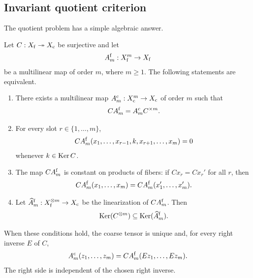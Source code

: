 \subsection{Invariant quotient criterion}
The quotient problem has a simple algebraic answer.

\begin{PRIQtheorem}\label{PRIQ:thm:universal-quotient}
Let $C:X_{\mathrm f}\twoheadrightarrow X_{\mathrm c}$ be surjective and let
\[
  A_m^{\mathrm f}:X_{\mathrm f}^m\to X_{\mathrm f}
\]
be a multilinear map of order $m$, where $m\geq1$.  The following statements are equivalent.

\begin{enumerate}[label=(\roman*),leftmargin=2.8em]
\item There exists a multilinear map $A_m^{\mathrm c}:X_{\mathrm c}^m\to X_{\mathrm c}$ of order $m$ such that
\[
  CA_m^{\mathrm f}=A_m^{\mathrm c}C^{\times m}.
\]

\item For every slot $r\in\{1,\ldots,m\}$,
\begin{equation}\label{PRIQ:eq:slot-kernel-condition}
  CA_m^{\mathrm f}(x_1,\ldots,x_{r-1},k,x_{r+1},\ldots,x_m)=0
\end{equation}
whenever $k\in\operatorname{Ker} C$.

\item The map $CA_m^{\mathrm f}$ is constant on products of fibers: if $Cx_r=Cx_r'$ for all $r$, then
\begin{equation}\label{PRIQ:eq:fiber-constancy-abstract}
  CA_m^{\mathrm f}(x_1,\ldots,x_m)
  =
  CA_m^{\mathrm f}(x_1',\ldots,x_m').
\end{equation}

\item Let $\widehat A_m^{\mathrm f}:X_{\mathrm f}^{\otimes m}\to X_{\mathrm c}$ be the linearization of $CA_m^{\mathrm f}$.  Then
\begin{equation}\label{PRIQ:eq:tensor-kernel-condition}
  \operatorname{Ker}(C^{\otimes m})
  \subseteq
  \operatorname{Ker}(\widehat A_m^{\mathrm f}).
\end{equation}
\end{enumerate}

When these conditions hold, the coarse tensor is unique and, for every right inverse $E$ of $C$,
\begin{equation}\label{PRIQ:eq:coarse-via-section}
  A_m^{\mathrm c}(z_1,\ldots,z_m)
  =
  CA_m^{\mathrm f}(Ez_1,\ldots,Ez_m).
\end{equation}
The right side is independent of the chosen right inverse.
\end{PRIQtheorem}

